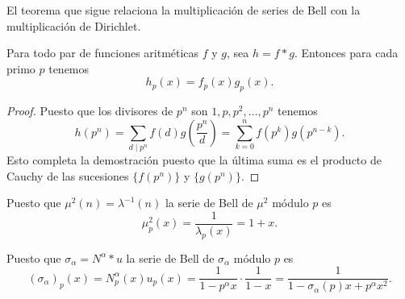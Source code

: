 \documentclass[12pt,a4paper]{book}
\begin{document}
    El teorema que sigue relaciona la multiplicación de series de Bell con la
    multiplicación de Dirichlet.

    \begin{teorema}
        Para todo par de funciones aritméticas $f$ y $g$, sea $h=f*g$. Entonces para cada
        primo $p$ tenemos
        \begin{equation*}
            h_p(x)=f_p(x)g_p(x).
        \end{equation*}
    \end{teorema}

    \begin{proof}
        Puesto que los divisores de $p^n$ son $1,p,p^2,\dots,p^n$ tenemos
        \begin{equation*}
            h(p^n)=\sum_{d\mid p^n}f(d)g\left(\frac{p^n}{d}\right)=\sum_{k=0}^{n}f(p^k)g(p^{n-k}).
        \end{equation*}
        Esto completa la demostración puesto que la última suma es el producto de Cauchy
        de las sucesiones $\{f(p^n)\}$ y $\{g(p^n)\}$.
    \end{proof}

    \begin{ejemplo}
        Puesto que $\mu^2(n)=\lambda^{-1}(n)$ la serie de Bell de $\mu^2$ módulo $p$ es
        \begin{equation*}
            \mu_p^2(x)=\frac{1}{\lambda_p(x)}=1+x.
        \end{equation*}
    \end{ejemplo}

    \begin{ejemplo}
        Puesto que $\sigma_\alpha=N^\alpha*u$ la serie de Bell de $\sigma_\alpha$ módulo $p$
        es
        \begin{equation*}
            (\sigma_\alpha)_p(x)=N_p^\alpha(x)u_p(x)=\frac{1}{1-p^\alpha x}\cdot\frac{1}{1-x}
            =\frac{1}{1-\sigma_\alpha(p)x+p^\alpha x^2}.
        \end{equation*}
    \end{ejemplo}
\end{document}
